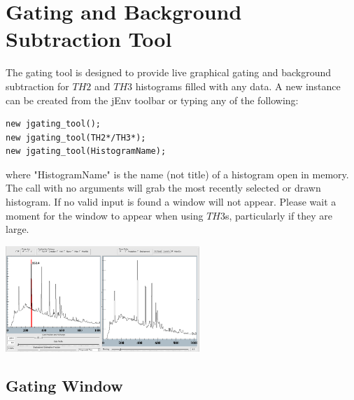 \documentclass[a4paper,10pt]{article}
\begin{document}
\bigskip
\bigskip
\section{Gating and Background Subtraction Tool}
The gating tool is designed to provide live graphical gating and background subtraction for $TH2$ and $TH3$ histograms filled with any data. 
A new instance can be created from the jEnv toolbar or typing any of the following:
\lstset{language=C++}
\begin{lstlisting}
new jgating_tool();
new jgating_tool(TH2*/TH3*);
new jgating_tool(HistogramName);
\end{lstlisting}
where "HistogramName" is the name (not title) of a histogram open in memory. The call with no arguments will grab the most recently selected or drawn histogram. If no valid input is found a window will not appear. Please wait a moment for the window to appear when using $TH3$s, particularly if they are large.
\begin{center}
\includegraphics[width=0.55\textwidth]{toolA.png}
\end{center}

\subsection{Gating Window}
\end{document}
